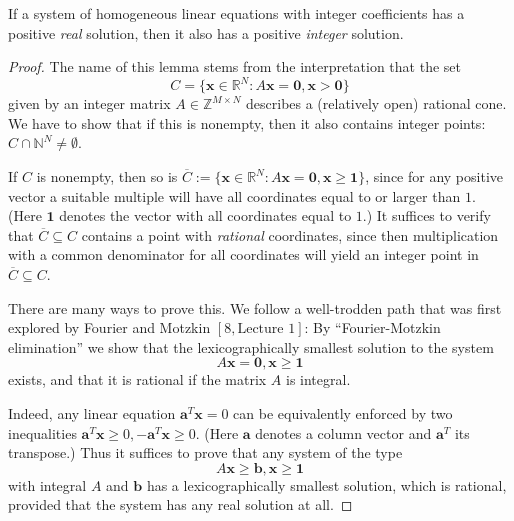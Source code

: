 \begin{lemma}
  \label{cone_lemma}
  If a system of homogeneous linear equations with integer
  coefficients has a positive \emph{real} solution, then it also has a positive
  \emph{integer} solution.
\end{lemma}
\begin{proof}
   The name of this lemma stems from the interpretation that the set
  \[
  C = \{\mathbf{x} \in \mathbb{R}^N : A\mathbf{x} = \mathbf{0}, \mathbf{x} > \mathbf{0}\}
  \]
  given by an integer matrix \( A \in \mathbb{Z}^{M \times N} \) describes a (relatively open) rational
  cone. We have to show that if this is nonempty, then it also contains integer
  points: \( C \cap \mathbb{N}^N \neq \emptyset \).

  If \( C \) is nonempty, then so is \(\overline{C} := \{\mathbf{x} \in \mathbb{R}^N : A\mathbf{x} = \mathbf{0}, \mathbf{x} \ge \mathbf{1}\}\), since
  for any positive vector a suitable multiple will have all coordinates equal to or
  larger than $1$. (Here $\mathbf{1}$ denotes the vector with all coordinates equal to $1$.)
  It suffices to verify that \( \overline{C} \subseteq C \) contains a point with \emph{rational}
  coordinates, since then multiplication with a common denominator for all coordinates
  will yield an integer point in \( \overline{C} \subseteq C \).

  There are many ways to prove this. We follow a well-trodden path that was
  first explored by Fourier and Motzkin \([8, \text{Lecture 1}]\): By ``Fourier-Motzkin
  elimination'' we show that the lexicographically smallest solution to the
  system
  \[
  A\mathbf{x} = \mathbf{0}, \mathbf{x} \ge \mathbf{1}
  \]
  exists, and that it is rational if the matrix \( A \) is integral.

  Indeed, any linear equation \( \mathbf{a}^T \mathbf{x} = 0 \) can be equivalently enforced by two
  inequalities \( \mathbf{a}^T \mathbf{x} \ge 0, -\mathbf{a}^T \mathbf{x} \ge 0 \). (Here $\mathbf{a}$ denotes a column vector and
  $\mathbf{a}^T$ its transpose.) Thus it suffices to prove that any system of the type
  \[
  A\mathbf{x} \ge \mathbf{b}, \mathbf{x} \ge \mathbf{1}
  \]
  with integral \( A \) and \( \mathbf{b} \) has a lexicographically smallest solution, which is
  rational, provided that the system has any real solution at all.


\end{proof}
